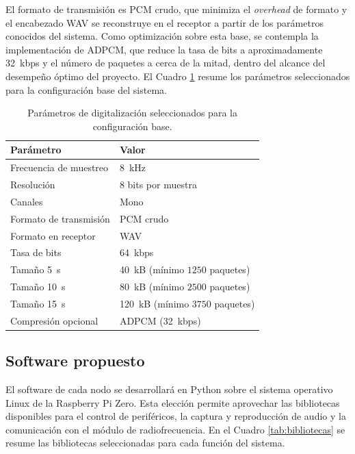 El formato de transmisión es PCM crudo, que minimiza el \textit{overhead} de formato y el encabezado WAV se reconstruye en el receptor a partir de los parámetros conocidos del sistema.
Como optimización sobre esta base, se contempla la implementación de ADPCM, que reduce la tasa de bits a aproximadamente \SI{32}{kbps} y el número de paquetes a cerca de la mitad, dentro del alcance del desempeño óptimo del proyecto.
El Cuadro \ref{tab:params_audio} resume los parámetros seleccionados para la configuración base del sistema.

\begin{table}[htb]
\centering
\caption{Parámetros de digitalización seleccionados para la configuración base.}
\label{tab:params_audio}
\begin{tabular}{@{}lp{2.5cm}@{}}
\toprule
Parámetro & Valor \\
\midrule
Frecuencia de muestreo  & \SI{8}{\kilo\hertz} \\
Resolución              & $8$ bits por muestra \\
Canales                 & Mono \\
\addlinespace
Formato de transmisión  & PCM crudo \\
Formato en receptor     & WAV \\
\addlinespace
Tasa de bits            & \SI{64}{kbps} \\
Tamaño \SI{5}{\second}  & \SI{40}{kB} (mínimo $1250$ paquetes) \\
Tamaño \SI{10}{\second} & \SI{80}{kB} (mínimo $2500$ paquetes) \\
Tamaño \SI{15}{\second} & \SI{120}{kB} (mínimo $3750$ paquetes) \\
\addlinespace
Compresión opcional     & ADPCM (\SI{32}{kbps}) \\
\bottomrule
\end{tabular}
\end{table}

\subsection{Software propuesto}

El software de cada nodo se desarrollará en Python sobre el sistema operativo Linux de la Raspberry Pi Zero.
Esta elección permite aprovechar las bibliotecas disponibles para el control de periféricos, la captura y reproducción de audio y la comunicación con el módulo de radiofrecuencia.
En el Cuadro \ref{tab:bibliotecas} se resume las bibliotecas seleccionadas para cada función del sistema.

